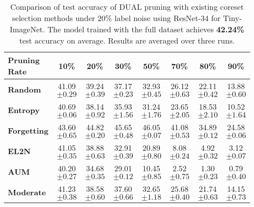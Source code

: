 \begin{table}[ht]
\caption{\label{tab:label_noise_20_tinyimagenet}Comparison of test accuracy of DUAL pruning with existing coreset selection methods under 20\% label noise using ResNet-34 for Tiny-ImageNet. The model trained with the full dataset achieves \textbf{42.24\%} test accuracy on average. Results are averaged over three runs.}
\setlength{\tabcolsep}{3.1pt}
\centering
\begin{tabular}{lccccccc}
    \toprule
    \textbf{Pruning Rate} & \textbf{10\%} & \textbf{20\%} & \textbf{30\%} & \textbf{50\%} & \textbf{70\%} & \textbf{80\%} & \textbf{90\%} \\
    \midrule
    \textbf{Random} & 41.09 \scriptsize{$\pm 0.29 $} & 39.24 \scriptsize{$\pm 0.39 $} & 37.17 \scriptsize{$\pm 0.23 $} & 32.93 \scriptsize{$\pm 0.45 $} & 26.12 \scriptsize{$\pm 0.63 $} & 22.11 \scriptsize{$\pm 0.42 $} & 13.88 \scriptsize{$\pm 0.60 $} \\
    
    \textbf{Entropy} & 40.69 \scriptsize{$\pm 0.06 $} & 38.14 \scriptsize{$\pm 0.92 $} & 35.93 \scriptsize{$\pm 1.56 $} & 31.24 \scriptsize{$\pm 1.76 $} & 23.65 \scriptsize{$\pm 2.05 $} & 18.53 \scriptsize{$\pm 2.10 $} & 10.52 \scriptsize{$\pm 1.64 $} \\
    
    \textbf{Forgetting} & 43.60 \scriptsize{$\pm 0.65 $} & 44.82 \scriptsize{$\pm 0.20 $} & 45.65 \scriptsize{$\pm 0.48 $} & 46.05 \scriptsize{$\pm 0.07 $} & 41.08 \scriptsize{$\pm 0.53 $} & 34.89 \scriptsize{$\pm 0.12 $} & 24.58 \scriptsize{$\pm 0.06 $} \\
    
    \textbf{EL2N} & 41.05 \scriptsize{$\pm 0.35 $} & 38.88 \scriptsize{$\pm 0.63 $} & 32.91 \scriptsize{$\pm 0.39 $} & 20.89 \scriptsize{$\pm 0.80 $} & 8.08 \scriptsize{$\pm 0.24 $} & 4.92  \scriptsize{$\pm 0.32 $} & 3.12 \scriptsize{$\pm 0.07 $} \\
    
    \textbf{AUM} & 40.20 \scriptsize{$\pm 0.27$} & 34.68 \scriptsize{$\pm 0.35 $} & 29.01 \scriptsize{$\pm 0.12$} & 10.45 \scriptsize{$\pm 0.85 $} & 2.52 \scriptsize{$\pm 0.75 $} & 1.30 \scriptsize{$\pm 0.23 $} & 0.79 \scriptsize{$\pm 0.40 $} \\
    
    \textbf{Moderate} & 41.23 \scriptsize{$\pm 0.38 $} & 38.58 \scriptsize{$\pm 0.60 $} & 37.60 \scriptsize{$\pm 0.66 $} & 32.65 \scriptsize{$\pm 1.18 $} & 25.68 \scriptsize{$\pm 0.40 $} & 21.74 \scriptsize{$\pm 0.63 $} & 14.15 \scriptsize{$\pm 0.73 $}  \\
    

\end{tabular}
\end{table}
